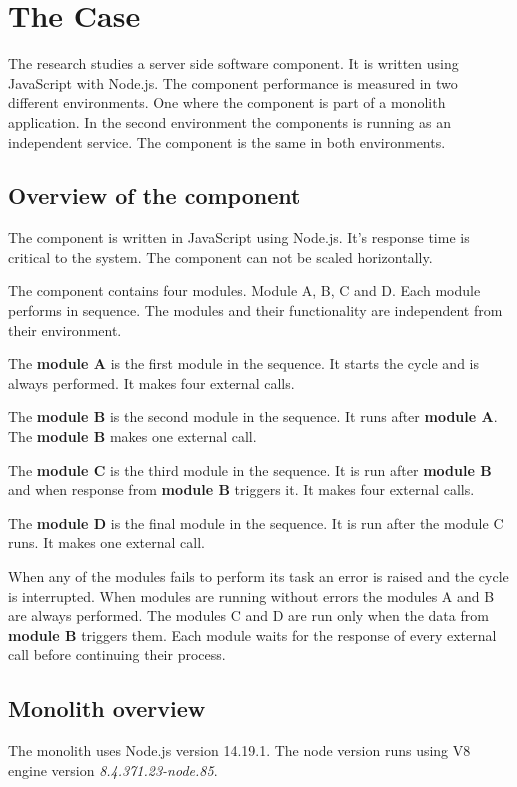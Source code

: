 \chapter{The Case\label{case}}
The research studies a server side software component.
It is written using JavaScript with Node.js.
The component performance is measured in two different environments.
One where the component is part of a monolith application.
In the second environment the components is running as an independent service.
The component is the same in both environments.

\section{Overview of the component}
The component is written in JavaScript using Node.js.
It's response time is critical to the system.
The component can not be scaled horizontally.

The component contains four modules.
Module A, B, C and D.
Each module performs in sequence.
The modules and their functionality are independent from their environment.

The \textbf{module A} is the first module in the sequence.
It starts the cycle and is always performed.
It makes four external calls.

The \textbf{module B} is the second module in the sequence.
It runs after \textbf{module A}.
The \textbf{module B} makes one external call.

The \textbf{module C} is the third module in the sequence.
It is run after \textbf{module B} and when response from \textbf{module B} triggers it.
It makes four external calls.

The \textbf{module D} is the final module in the sequence.
It is run after the module C runs.
It makes one external call.

When any of the modules fails to perform its task an error is raised and the cycle is interrupted.
When modules are running without errors the modules A and B are always performed. 
The modules C and D are run only when the data from \textbf{module B} triggers them.
Each module waits for the response of every external call before continuing their process.

\section{Monolith overview}
The monolith uses Node.js version 14.19.1. The node version runs using V8 engine version \textit{8.4.371.23-node.85}.

